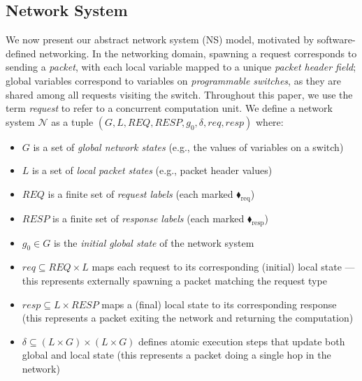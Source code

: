 \subsection{Network System}    
We now present our abstract network system (NS) model, motivated by software-defined networking. In the networking domain, spawning a request corresponds to sending a \textit{packet}, with each local variable mapped to a unique \textit{packet header field}; global variables correspond to variables on \textit{programmable switches}, as they are shared among all requests visiting the switch. Throughout this paper, we use the term \emph{request} to refer to a concurrent computation unit. 
%
We define a network system $\mathcal{N}$ as a tuple $(G, L, \mathit{REQ},  \mathit{RESP}, g_0, \delta, \mathit{req}, \mathit{resp})$ where:
\begin{itemize}
\item $G$ is a set of \textit{global network states} (e.g., the values of variables on a switch)

\item $L$ is a set of \textit{local packet states} (e.g., packet header values)

\item $\mathit{REQ}$ is a finite set of \textit{request labels} (each marked {\color{ForestGreen}$\blacklozenge_\text{req}$})

\item $\mathit{RESP}$ is a finite set of \textit{response labels} (each marked {\color{red}$\blacklozenge_\text{resp}$})

\item $g_0 \in G$ is the \textit{initial global state} of the network system

\item $\mathit{req} \subseteq \mathit{REQ} \times  L$ maps each request to its corresponding (initial) local state --- this represents externally spawning a packet matching the request type

\item $\mathit{resp} \subseteq L \times \mathit{RESP}$ maps a (final) local state to its corresponding response (this represents a packet exiting the network and returning the computation)

\item $\delta \subseteq  (L \times G) \times ( L \times G)$ defines atomic execution steps that update both global and local state (this represents a packet doing a single hop in the network)
\end{itemize}

